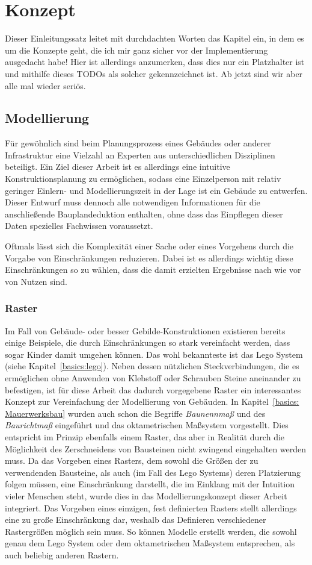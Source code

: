 \chapter{Konzept}
Dieser Einleitungssatz leitet mit durchdachten Worten das Kapitel ein, in dem es um die Konzepte geht, die ich mir ganz sicher vor der Implementierung ausgedacht habe!
Hier ist allerdings anzumerken, dass dies nur ein Platzhalter ist und mithilfe dieses TODOs als solcher gekennzeichnet ist.
Ab jetzt sind wir aber alle mal wieder seriös.

\section{Modellierung}
Für gewöhnlich sind beim Planungsprozess eines Gebäudes oder anderer Infrastruktur eine Vielzahl an Experten aus unterschiedlichen Disziplinen beteiligt.
Ein Ziel dieser Arbeit ist es allerdings eine intuitive Konstruktionsplanung zu ermöglichen, sodass eine Einzelperson mit relativ geringer Einlern- und Modellierungszeit in der Lage ist ein Gebäude zu entwerfen.
Dieser Entwurf muss dennoch alle notwendigen Informationen für die anschließende Bauplandeduktion enthalten, ohne dass das Einpflegen dieser Daten spezielles Fachwissen voraussetzt.

Oftmals lässt sich die Komplexität einer Sache oder eines Vorgehens durch die Vorgabe von Einschränkungen reduzieren.
Dabei ist es allerdings wichtig diese Einschränkungen so zu wählen, dass die damit erzielten Ergebnisse nach wie vor von Nutzen sind.

\subsection{Raster}\label{concept:raster}
Im Fall von Gebäude- oder besser Gebilde-Konstruktionen existieren bereits einige Beispiele, die durch Einschränkungen so stark vereinfacht werden, dass sogar Kinder damit umgehen können.
Das wohl bekannteste ist das Lego System (siehe Kapitel~\ref{basics:lego}).
Neben dessen nützlichen Steckverbindungen, die es ermöglichen ohne Anwenden von Klebstoff oder Schrauben Steine aneinander zu befestigen, ist für diese Arbeit das dadurch vorgegebene Raster ein interessantes Konzept zur Vereinfachung der Modellierung von Gebäuden.
In Kapitel~\ref{basics: Mauerwerksbau} wurden auch schon die Begriffe \textit{Baunennmaß} und des \textit{Baurichtmaß} eingeführt und das oktametrischen Maßsystem vorgestellt.
Dies entspricht im Prinzip ebenfalls einem Raster, das aber in Realität durch die Möglichkeit des Zerschneidens von Bausteinen nicht zwingend eingehalten werden muss.
Da das Vorgeben eines Rasters, dem sowohl die Größen der zu verwendenden Bausteine, als auch (im Fall des Lego Systems) deren Platzierung folgen müssen, eine Einschränkung darstellt, die im Einklang mit der Intuition vieler Menschen steht, wurde dies in das Modellierungskonzept dieser Arbeit integriert.
Das Vorgeben eines einzigen, fest definierten Rasters stellt allerdings eine zu große Einschränkung dar, weshalb das Definieren verschiedener Rastergrößen möglich sein muss.
So können Modelle erstellt werden, die sowohl genau dem Lego System oder dem oktametrischen Maßsystem entsprechen, als auch beliebig anderen Rastern.

